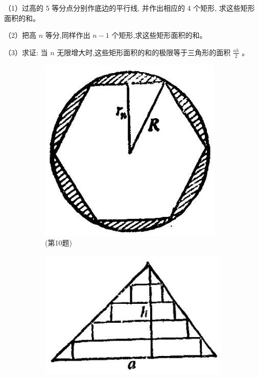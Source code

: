 \documentclass[lang=cn,newtx,12pt,scheme=chinese]{elegantbook}
\begin{document}
\begin{problemset}[习题一]
	（1）过高的 5 等分点分别作底边的平行线, 并作出相应的 4 个矩形, 求这些矩形面积的和。
	
	（2）把高 \(n\) 等分,同样作出 \(n - 1\) 个矩形,求这些矩形面积的和。
	
	（3）求证: 当 \(n\) 无限增大时,这些矩形面积的和的极限等于三角形的面积 \(\frac{ah}{2}\) 。
	
		\begin{figure}[h]
		\centering
		\begin{subfigure}[h]{0.45\textwidth}
			\centering
			\includegraphics[max width=\textwidth]{images/01912c18-5c3f-733d-b775-749ba9897a9d_20_155049.jpg}
			\caption{(第10题)}
		\end{subfigure}
		\hfill %
		\begin{subfigure}[h]{0.45\textwidth}
			\centering
			\includegraphics[max width=\textwidth]{images/01912c18-5c3f-733d-b775-749ba9897a9d_20_862371.jpg}

\end{subfigure}
\end{figure}
\end{problemset}
\end{document}
